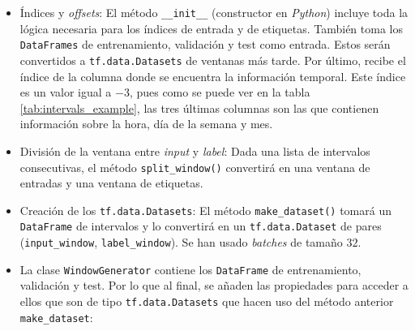 \begin{itemize}
    \item Índices y \textit{offsets}:  El método \small{\verb|__init__|} (constructor en \textit{Python}) incluye toda la lógica necesaria para los índices de entrada y de etiquetas. También toma los \small{\verb|DataFrames|} de entrenamiento, validación y test como entrada. Estos serán convertidos a \small{\verb|tf.data.Datasets|} de ventanas más tarde. Por último, recibe el índice de la columna donde se encuentra la información temporal. Este índice es un valor igual a $-3$, pues como se puede ver en la tabla \ref{tab:intervals_example}, las tres últimas columnas son las que contienen información sobre la hora, día de la semana y mes.

    \item División de la ventana entre \textit{input} y \textit{label}: Dada una lista de intervalos consecutivas, el método \small{\verb|split_window()|} convertirá en una ventana de entradas y una ventana de etiquetas.
    
    \item Creación de los \small{\verb|tf.data.Datasets|}: El método \small{\verb|make_dataset()|} tomará un \small{\verb|DataFrame|} de intervalos y lo convertirá en un \small{\verb|tf.data.Dataset|} de pares (\small{\verb|input_window|}, \small{\verb|label_window|}). Se han usado \textit{batches} de tamaño $32$.
    
    
    \item La clase \small{\verb|WindowGenerator|} contiene los \small{\verb|DataFrame|} de entrenamiento, validación y test. Por lo que al final, se añaden las propiedades para acceder a ellos que son de tipo \small{\verb|tf.data.Datasets|} que hacen uso del método anterior \small\verb|make_dataset|:

\end{itemize}